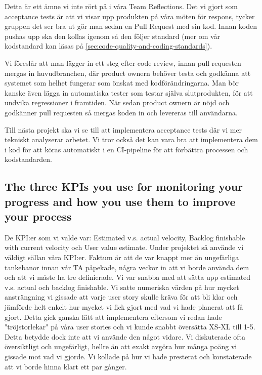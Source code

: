 \documentclass{scrartcl}
\begin{document}
Detta är ett ämne vi inte rört på i våra Team Reflections.
Det vi gjort som acceptance tests är att vi visar upp produkten på våra möten för respons, tycker gruppen det ser bra ut gör man sedan en Pull Request med sin kod.
Innan koden pushas upp ska den kollas igenom så den följer standard (mer om vår kodstandard kan läsas på \ref{sec:code-quality-and-coding-standards}).

Vi föreslår att man lägger in ett steg efter code review, innan pull requesten mergas in huvudbranchen, där product ownern behöver testa och godkänna att systemet som helhet fungerar som önskat med kodförändringarna.
Man bör kanske även lägga in automatiska tester som testar själva slutprodukten, för att undvika regressioner i framtiden.
När sedan product ownern är nöjd och godkänner pull requesten så mergas koden in och levereras till användarna.

Till nästa projekt ska vi se till att implementera acceptance tests där vi mer tekniskt analyserar arbetet. Vi tror också det kan vara bra att implementera dem i kod för att köras automatiskt i en CI-pipeline för att förbättra processen och kodstandarden.

\subsection{The three KPIs you use for monitoring your progress and how you use them to improve your process}

De KPI:er som vi valde var: Estimated v.s. actual velocity, Backlog finishable with current velocity och User value estimate. 
Under projektet så använde vi väldigt sällan våra KPI:er. Faktum är att de var knappt mer än ungefärliga tankebanor innan vår TA påpekade, några veckor in att vi borde använda dem och att vi måste ha tre definierade. Vi var snabba med att sätta upp estimated v.s. actual och backlog finishable. Vi satte numeriska värden på hur mycket ansträngning vi gissade att varje user story skulle kräva för att bli klar och jämförde helt enkelt hur mycket vi fick gjort med vad vi hade planerat att få gjort. Detta gick ganska lätt att implementera eftersom vi redan hade "tröjstorlekar" på våra user stories och vi kunde snabbt översätta XS-XL till 1-5. Detta betydde dock inte att vi använde den något vidare. Vi diskuterade ofta översiktligt och ungefärligt, hellre än att exakt avgöra hur många poäng vi gissade mot vad vi gjorde. Vi kollade på hur vi hade presterat och konstaterade att vi borde hinna klart ett par gånger. 
\end{document}
